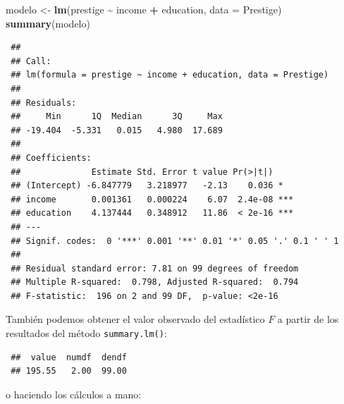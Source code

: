 \documentclass[
  spanish,
  10pt,
]{book}
\newenvironment{Shaded}{\begin{snugshade}}{\end{snugshade}}
\newcommand{\AttributeTok}[1]{\textcolor[rgb]{0.13,0.29,0.53}{#1}}
\newcommand{\CommentTok}[1]{\textcolor[rgb]{0.56,0.35,0.01}{\textit{#1}}}
\newcommand{\DecValTok}[1]{\textcolor[rgb]{0.00,0.00,0.81}{#1}}
\newcommand{\FunctionTok}[1]{\textcolor[rgb]{0.13,0.29,0.53}{\textbf{#1}}}
\newcommand{\NormalTok}[1]{#1}
\newcommand{\OtherTok}[1]{\textcolor[rgb]{0.56,0.35,0.01}{#1}}
\newcommand{\SpecialCharTok}[1]{\textcolor[rgb]{0.81,0.36,0.00}{\textbf{#1}}}
\theoremstyle{break}
\theoremstyle{nonumberplain}
\renewcommand{\CommentTok}[1]{\textcolor[rgb]{0.41,0.41,0.41}{\texttt{#1}}}
\begin{document}
\begin{Shaded}
\begin{Highlighting}[]
\NormalTok{modelo }\OtherTok{\textless{}{-}} \FunctionTok{lm}\NormalTok{(prestige }\SpecialCharTok{\textasciitilde{}}\NormalTok{ income }\SpecialCharTok{+}\NormalTok{ education, }\AttributeTok{data =}\NormalTok{ Prestige)}
\FunctionTok{summary}\NormalTok{(modelo)}
\end{Highlighting}
\end{Shaded}

\begin{verbatim}
 ## 
 ## Call:
 ## lm(formula = prestige ~ income + education, data = Prestige)
 ## 
 ## Residuals:
 ##     Min      1Q  Median      3Q     Max 
 ## -19.404  -5.331   0.015   4.980  17.689 
 ## 
 ## Coefficients:
 ##              Estimate Std. Error t value Pr(>|t|)    
 ## (Intercept) -6.847779   3.218977   -2.13    0.036 *  
 ## income       0.001361   0.000224    6.07  2.4e-08 ***
 ## education    4.137444   0.348912   11.86  < 2e-16 ***
 ## ---
 ## Signif. codes:  0 '***' 0.001 '**' 0.01 '*' 0.05 '.' 0.1 ' ' 1
 ## 
 ## Residual standard error: 7.81 on 99 degrees of freedom
 ## Multiple R-squared:  0.798, Adjusted R-squared:  0.794 
 ## F-statistic:  196 on 2 and 99 DF,  p-value: <2e-16
\end{verbatim}

También podemos obtener el valor observado del estadístico \(F\)
a partir de los resultados del método \texttt{summary.lm()}:

\begin{Shaded}
\end{Shaded}

\begin{verbatim}
 ##  value  numdf  dendf 
 ## 195.55   2.00  99.00
\end{verbatim}

o haciendo los cálculos a mano:
\end{document}
